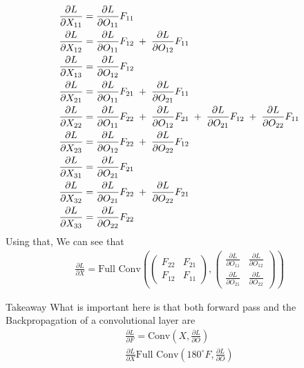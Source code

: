 \begin{align*} 
	\frac{\partial L}{\partial X_{11}} &= \frac{\partial L}{\partial O_{11}} F_{11}\\
	\frac{\partial L}{\partial X_{12}} &= \frac{\partial L}{\partial O_{11}} F_{12} \;+\; \frac{\partial L}{\partial O_{12}} F_{11}\\
	\frac{\partial L}{\partial X_{13}} &= \frac{\partial L}{\partial O_{12}} F_{12}\\
	\frac{\partial L}{\partial X_{21}} &= \frac{\partial L}{\partial O_{11}} F_{21} \;+\; \frac{\partial L}{\partial O_{21}} F_{11}\\
	\frac{\partial L}{\partial X_{22}} &= \frac{\partial L}{\partial O_{11}} F_{22} \;+\; \frac{\partial L}{\partial O_{12}} F_{21}\;+\; \frac{\partial L}{\partial O_{21}} F_{12} \;+\; \frac{\partial L}{\partial O_{22}} F_{11}\\
	\frac{\partial L}{\partial X_{23}} &= \frac{\partial L}{\partial O_{12}} F_{22} \;+\; \frac{\partial L}{\partial O_{22}} F_{12}\\
	\frac{\partial L}{\partial X_{31}} &= \frac{\partial L}{\partial O_{21}} F_{21}\\
	\frac{\partial L}{\partial X_{32}} &= \frac{\partial L}{\partial O_{21}} F_{22} \;+\; \frac{\partial L}{\partial O_{22}} F_{21}\\
	\frac{\partial L}{\partial X_{33}} &= \frac{\partial L}{\partial O_{22}} F_{22}
\end{align*}
Using that, We can see that 
\begin{align*} 
	\frac{\partial L}{\partial X}  =  \text{Full Conv}\left(\begin{pmatrix} F_{22} & F_{21} \\ F_{12} & F_{11} \end{pmatrix}, \begin{pmatrix} \frac{\partial L}{\partial O_{11}}  & \frac{\partial L}{\partial O_{12}}  \\ \frac{\partial L}{\partial O_{21}}  & \frac{\partial L}{\partial O_{22}}  \end{pmatrix} \right)
\end{align*}
\begin{parag}{Takeaway}
    What is important here is that both forward pass and the Backpropagation of a convolutional layer are 
	\begin{align*} 
		\frac{\partial L}{\partial F}  = \text{Conv} \left(X, \frac{\partial L}{\partial O} \right)\\
		\frac{\partial L}{\partial X}  \text{Full Conv} \left(\text{180}^{\circ}F, \frac{\partial L}{\partial O} \right)
	\end{align*}

\end{parag}


